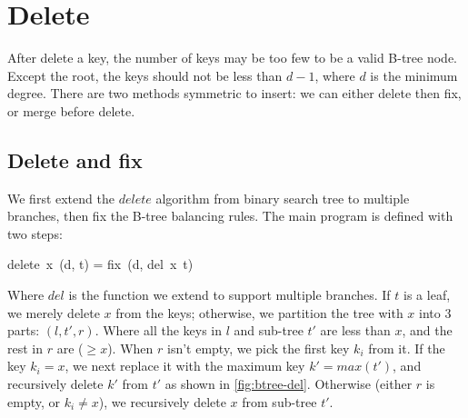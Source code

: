 \documentclass[b5paper]{article}
\begin{document}
\begin{Answer}[ref = {ex:btree-binary_lookup}]
\end{Answer}

\section{Delete}

After delete a key, the number of keys may be too few to be a valid B-tree node. Except the root, the keys should not be less than $d - 1$, where $d$ is the minimum degree. There are two methods symmetric to insert: we can either delete then fix, or merge before delete.

\subsection{Delete and fix}

We first extend the $delete$ algorithm from binary search tree to multiple branches, then fix the B-tree balancing rules. The main program is defined with two steps:

\be
delete\ x\ (d, t) = fix\ (d, del\ x\ t)
\ee

Where $del$ is the function we extend to support multiple branches. If $t$ is a leaf, we merely delete $x$ from the keys; otherwise, we partition the tree with $x$ into 3 parts: $(l, t', r)$. Where all the keys in $l$ and sub-tree $t'$ are less than $x$, and the rest in $r$ are ($\geq x$). When $r$ isn't empty, we pick the first key $k_i$ from it. If the key $k_i = x$, we next replace it with the maximum key $k' = max(t')$, and recursively delete $k'$ from $t'$ as shown in \cref{fig:btree-del}. Otherwise (either $r$ is empty, or $k_i \neq x$), we recursively delete $x$ from sub-tree $t'$.
\end{document}
